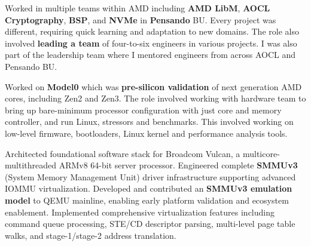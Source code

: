 \documentclass[12pt,a4paper]{pawesome-cv}
\begin{document}
\begin{cventries}
\end{cventries}
\acvsidebarpagebreak
{}
\label{sec:org4ac3960}

\begin{cventries}
\begin{experiencecontent}
Worked in multiple teams within AMD including \textbf{AMD LibM}, \textbf{AOCL Cryptography}, \textbf{BSP}, and \textbf{NVMe} in \textbf{Pensando} BU.
Every project was different, requiring quick learning and adaptation to new domains. The role also involved \textbf{leading a team} of four-to-six
engineers in various projects. I was also part of the leadership team where I mentored engineers from across AOCL and Pensando BU.\end{experiencecontent}
\begin{experiencecontent}
Worked on \textbf{Model0} which was \textbf{pre-silicon validation} of next generation AMD cores, including Zen2 and Zen3. The role involved working with
hardware team to bring up bare-minimum processor configuration with just core and memory controller, and run Linux, stressors and benchmarks.
This involved working on low-level firmware, bootloaders, Linux kernel and performance analysis tools.\end{experiencecontent}
\begin{experiencecontent}
Architected foundational software stack for Broadcom Vulcan, a multicore-multithreaded ARMv8 64-bit server processor.
Engineered complete \textbf{SMMUv3} (System Memory Management Unit) driver infrastructure supporting advanced IOMMU virtualization.
Developed and contributed an \textbf{SMMUv3 emulation model} to QEMU mainline, enabling early platform validation and ecosystem enablement.
Implemented comprehensive virtualization features including command queue processing, STE/CD descriptor parsing, multi-level page table walks, and stage-1/stage-2 address translation.\end{experiencecontent}

\end{cventries}
\end{document}
